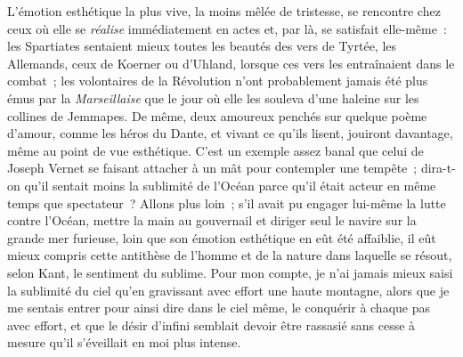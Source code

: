 \documentclass[french,twoside]{book} %
\begin{document}
L’émotion esthétique la plus vive, la moins mêlée de tristesse, se rencontre chez ceux où elle se \emph{réalise}  immédiatement en actes et, par là, se satisfait elle-même : les Spartiates sentaient mieux toutes les beautés des vers de Tyrtée, les Allemands, ceux de Koerner ou d’Uhland, lorsque ces vers les entraînaient dans le combat ; les volontaires de la Révolution n’ont probablement jamais été plus émus par la \emph{Marseillaise} que le jour où elle les souleva d’une haleine sur les collines de Jemmapes. De même, deux amoureux penchés sur quelque poème d’amour, comme les héros du Dante, et vivant ce qu’ils lisent, jouiront davantage, même au point de vue esthétique. C’est un exemple assez banal que celui de Joseph Vernet se faisant attacher à un mât pour contempler une tempête ; dira-t-on qu’il sentait moins la sublimité de l’Océan parce qu’il était acteur en même temps que spectateur ? Allons plus loin ; s’il avait pu engager lui-même la lutte contre l’Océan, mettre la main au gouvernail et diriger seul le navire sur la grande mer furieuse, loin que son émotion esthétique en eût été affaiblie, il eût mieux compris cette antithèse de l’homme et de la nature dans laquelle se résout, selon Kant, le sentiment du sublime. Pour mon compte, je n’ai jamais mieux saisi la sublimité du ciel qu’en gravissant avec effort une haute montagne, alors que je me sentais entrer pour ainsi dire dans le ciel même, le conquérir à chaque pas avec effort, et que le désir d’infini semblait devoir être rassasié sans cesse à mesure qu’il s’éveillait en moi plus intense.\par
\end{document}
